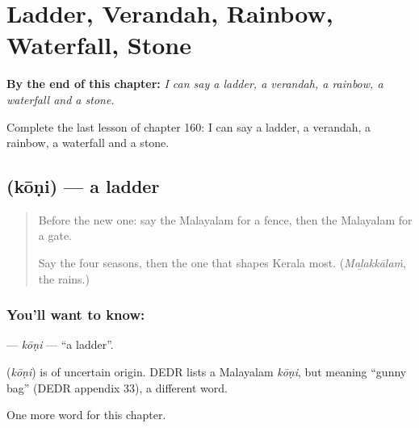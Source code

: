 
\chapter{Ladder, Verandah, Rainbow, Waterfall, Stone}
\label{ch:ml-ladder-verandah-rainbow-waterfall-stone}

\begin{chapteropening}
\textbf{By the end of this chapter:} \emph{I can say a ladder, a verandah, a rainbow, a waterfall and a stone.}

Complete the last lesson of chapter 160: I can say a ladder, a verandah, a rainbow, a waterfall and a stone.
\end{chapteropening}

\section[\texorpdfstring{\ml{കോണി} (kōṇi)}{കോണി (kōṇi)}]{ (kōṇi) — a ladder}

\label{lesson:ML-C160-koni}



\begin{quote}
Before the new one: say the Malayalam for a fence, then the Malayalam for a gate.

Say the four seasons, then the one that shapes Kerala most. (\emph{Maḻakkālaṁ}, the rains.)
\end{quote}

\subsection*{You'll want to know: }
\textbf{} — \emph{kōṇi} — \textquotedblleft{}a ladder\textquotedblright{}.

\begin{cousinweb}
\textbf{} (\emph{kōṇi}) is of uncertain origin. DEDR lists a Malayalam \emph{kōṇi}, but meaning \textquotedblleft{}gunny bag\textquotedblright{} (DEDR appendix 33), a different word.
\end{cousinweb}

\begin{grammarlens}[title={What you've built}]
One more word for this chapter.
\end{grammarlens}

